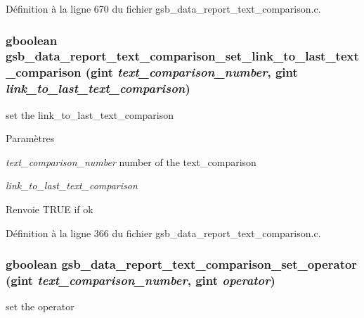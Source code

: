 Définition à la ligne 670 du fichier gsb\_\-data\_\-report\_\-text\_\-comparison.c.

\subsubsection[{gsb\_\-data\_\-report\_\-text\_\-comparison\_\-set\_\-link\_\-to\_\-last\_\-text\_\-comparison}]{\setlength{\rightskip}{0pt plus 5cm}gboolean gsb\_\-data\_\-report\_\-text\_\-comparison\_\-set\_\-link\_\-to\_\-last\_\-text\_\-comparison (gint {\em text\_\-comparison\_\-number}, \/  gint {\em link\_\-to\_\-last\_\-text\_\-comparison})}\label{gsb__data__report__text__comparison_8c_a567c2e8fee6656c84711b5c841837ac3}
set the link\_\-to\_\-last\_\-text\_\-comparison


\begin{DoxyParams}{Paramètres}
\item[{\em text\_\-comparison\_\-number}]number of the text\_\-comparison \item[{\em link\_\-to\_\-last\_\-text\_\-comparison}]\end{DoxyParams}
\begin{DoxyReturn}{Renvoie}
TRUE if ok 
\end{DoxyReturn}


Définition à la ligne 366 du fichier gsb\_\-data\_\-report\_\-text\_\-comparison.c.

\subsubsection[{gsb\_\-data\_\-report\_\-text\_\-comparison\_\-set\_\-operator}]{\setlength{\rightskip}{0pt plus 5cm}gboolean gsb\_\-data\_\-report\_\-text\_\-comparison\_\-set\_\-operator (gint {\em text\_\-comparison\_\-number}, \/  gint {\em operator})}\label{gsb__data__report__text__comparison_8c_ab02defea7727c6cec1d81d31bf64ebde}
set the operator


